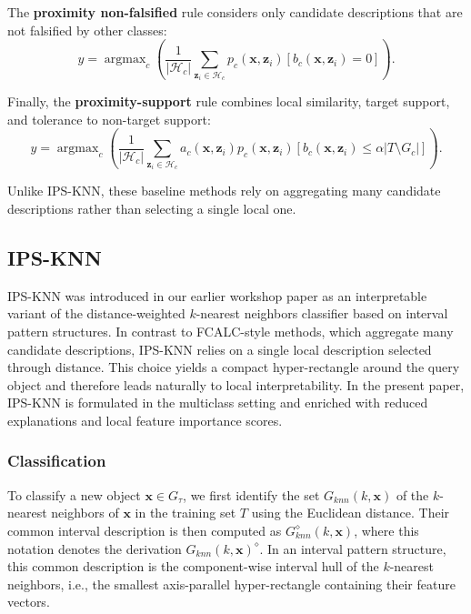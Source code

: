 \documentclass[a4paper,fleqn]{cas-sc}
\DeclareMathOperator*{\argmax}{argmax}
\begin{document}
The \textbf{proximity non-falsified} rule considers only candidate descriptions that are not falsified by other classes:
\begin{equation}
    y = \argmax_c \left(
    \frac{1}{|\mathcal{H}_c|}
    \sum_{\mathbf{z}_i \in \mathcal{H}_c} p_c(\mathbf{x},\mathbf{z}_i) [b_c(\mathbf{x},\mathbf{z}_i) = 0]
    \right).
\end{equation}

Finally, the \textbf{proximity-support} rule combines local similarity, target support, and tolerance to non-target support:
\begin{equation}
    y = \argmax_c \left(
    \frac{1}{|\mathcal{H}_c|}
    \sum_{\mathbf{z}_i \in \mathcal{H}_c}
    a_c(\mathbf{x},\mathbf{z}_i) p_c(\mathbf{x},\mathbf{z}_i) [b_c(\mathbf{x},\mathbf{z}_i) \leq \alpha |T \setminus G_c|]
    \right).
\end{equation}

Unlike IPS-KNN, these baseline methods rely on aggregating many candidate descriptions rather than selecting a single local one.


\subsection{IPS-KNN}
IPS-KNN was introduced in our earlier workshop paper \cite{tomat2023interval} as an interpretable variant of the distance-weighted \(k\)-nearest neighbors classifier based on interval pattern structures. In contrast to FCALC-style methods, which aggregate many candidate descriptions, IPS-KNN relies on a single local description selected through distance. This choice yields a compact hyper-rectangle around the query object and therefore leads naturally to local interpretability. In the present paper, IPS-KNN is formulated in the multiclass setting and enriched with reduced explanations and local feature importance scores.

\subsubsection{Classification}
To classify a new object \(\mathbf{x}\in G_\tau\), we first identify the set \(G_{knn}(k,\mathbf{x})\) of the \(k\)-nearest neighbors of \(\mathbf{x}\) in the training set \(T\) using the Euclidean distance. Their common interval description is then computed as \(G_{knn}^{\diamond}(k,\mathbf{x})\), where this notation denotes the derivation \(G_{knn}(k,\mathbf{x})^\diamond\). In an interval pattern structure, this common description is the component-wise interval hull of the \(k\)-nearest neighbors, i.e., the smallest axis-parallel hyper-rectangle containing their feature vectors.
\end{document}
